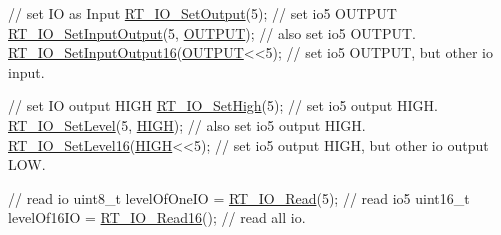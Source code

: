 \begin{DoxyCode}
\textcolor{comment}{// set IO as Input}
\mbox{\hyperlink{a00014_a80f50c7de76076789b624b7fce7531c6}{RT\_IO\_SetOutput}}(5);                 \textcolor{comment}{// set io5 OUTPUT}
\mbox{\hyperlink{a00014_ae845dc41cbf1b32b4d576373d1866d65}{RT\_IO\_SetInputOutput}}(5, \mbox{\hyperlink{a00014_a61a3c9a18380aafb6e430e79bf596557}{OUTPUT}});    \textcolor{comment}{// also set io5 OUTPUT.}
\mbox{\hyperlink{a00014_ade4bc867a36445fe0debc59cd5c9d9a5}{RT\_IO\_SetInputOutput16}}(\mbox{\hyperlink{a00014_a61a3c9a18380aafb6e430e79bf596557}{OUTPUT}}<<5);  \textcolor{comment}{// set io5 OUTPUT, but other io input.}

\textcolor{comment}{// set IO output HIGH}
\mbox{\hyperlink{a00014_a752d981d1948aeae63c1a86070ae8e3a}{RT\_IO\_SetHigh}}(5);           \textcolor{comment}{// set io5 output HIGH.}
\mbox{\hyperlink{a00014_a95fe40498ba314e1ea68aaa50335e7ef}{RT\_IO\_SetLevel}}(5, \mbox{\hyperlink{a00014_a5bb885982ff66a2e0a0a45a8ee9c35e2}{HIGH}});    \textcolor{comment}{// also set io5 output HIGH.}
\mbox{\hyperlink{a00014_a5a3ae496ca3e12098c74c9f13b20c554}{RT\_IO\_SetLevel16}}(\mbox{\hyperlink{a00014_a5bb885982ff66a2e0a0a45a8ee9c35e2}{HIGH}}<<5);  \textcolor{comment}{// set io5 output HIGH, but other io output LOW.}

\textcolor{comment}{// read io}
uint8\_t levelOfOneIO = \mbox{\hyperlink{a00014_aa69642c4177a35776090fdcf78d12e3b}{RT\_IO\_Read}}(5);   \textcolor{comment}{// read io5}
uint16\_t levelOf16IO = \mbox{\hyperlink{a00014_acf9c93d24ffeac5705da2c83ea2303d1}{RT\_IO\_Read16}}();  \textcolor{comment}{// read all io.}
\end{DoxyCode}
 
